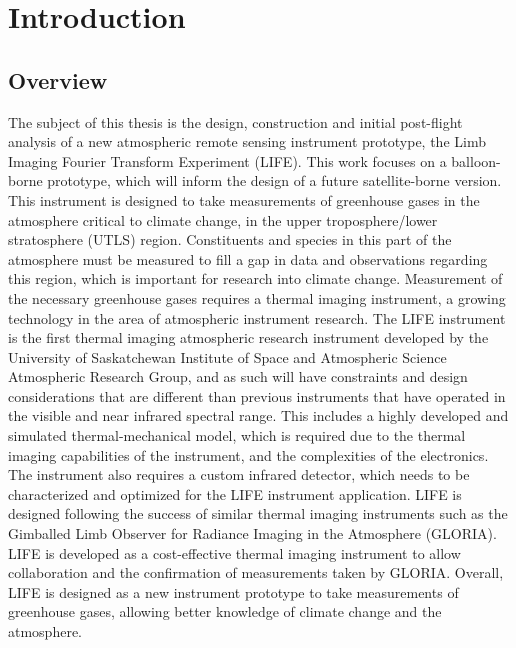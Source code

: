 \chapter{Introduction}

\section{Overview}
The subject of this thesis is the design, construction and initial post-flight analysis of a new atmospheric remote sensing instrument prototype, the Limb Imaging Fourier Transform Experiment (LIFE). This work focuses on a balloon-borne prototype, which will inform the design of a future satellite-borne version. This instrument is designed to take measurements of greenhouse gases in the atmosphere critical to climate change, in the upper troposphere/lower stratosphere (UTLS) region. Constituents and species in this part of the atmosphere must be measured to fill a gap in data and observations regarding this region, which is important for research into climate change. Measurement of the necessary greenhouse gases requires a thermal imaging instrument, a growing technology in the area of atmospheric instrument research. The LIFE instrument is the first thermal imaging atmospheric research instrument developed by the University of Saskatchewan Institute of Space and Atmospheric Science Atmospheric Research Group, and as such will have constraints and design considerations that are different than previous instruments that have operated in the visible and near infrared spectral range. This includes a highly developed and simulated thermal-mechanical model, which is required due to the thermal imaging capabilities of the instrument, and the complexities of the electronics. The instrument also requires a custom infrared detector, which needs to be characterized and optimized for the LIFE instrument application. LIFE is designed following the success of similar thermal imaging instruments such as the Gimballed Limb Observer for Radiance Imaging in the Atmosphere (GLORIA). LIFE is developed as a cost-effective thermal imaging instrument to allow collaboration and the confirmation of measurements taken by GLORIA. Overall, LIFE is designed as a new instrument prototype to take measurements of greenhouse gases, allowing better knowledge of climate change and the atmosphere.

